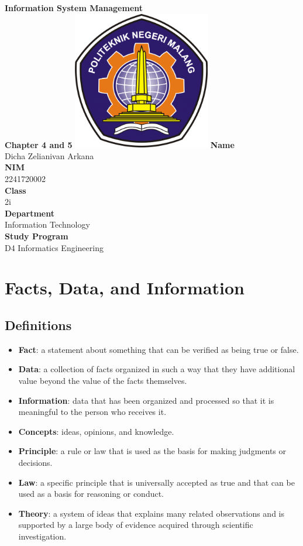 \documentclass[12pt,titlepage]{article}
\newcommand{\vSubject}{Information System Management}
\newcommand{\vSubtitle}{Chapter 4 and 5}
\newcommand{\vName}{Dicha Zelianivan Arkana}
\newcommand{\vNIM}{2241720002}
\newcommand{\vClass}{2i}
\newcommand{\vDepartment}{Information Technology}
\newcommand{\vStudyProgram}{D4 Informatics Engineering}
\begin{document}
\begin{titlepage}
    \centering
    \vfill
    {\bfseries\LARGE
        \vSubject\\
        \vskip0.25cm
        \vSubtitle
    }
    \vfill
    \includegraphics[width=6cm]{images/polinema-logo.png}
    \vfill
    {
        \textbf{Name}\\
        \vName\\
        \vskip0.5cm
        \textbf{NIM}\\
        \vNIM\\
        \vskip0.5cm
        \textbf{Class}\\
        \vClass\\
        \vskip0.5cm
        \textbf{Department}\\
        \vDepartment\\
        \vskip0.5cm
        \textbf{Study Program}\\
        \vStudyProgram
    }
\end{titlepage}

\section{Facts, Data, and Information}
\subsection{Definitions}
\begin{itemize}
    \item \textbf{Fact}: a statement about something that can be verified as being true or false.
    \item \textbf{Data}: a collection of facts organized in such a way that they have additional value beyond the value of the facts themselves.
    \item \textbf{Information}: data that has been organized and processed so that it is meaningful to the person who receives it.
    \item \textbf{Concepts}: ideas, opinions, and knowledge.
    \item \textbf{Principle}: a rule or law that is used as the basis for making judgments or decisions.
    \item \textbf{Law}: a specific principle that is universally accepted as true and that can be used as a basis for reasoning or conduct.
    \item \textbf{Theory}: a system of ideas that explains many related observations and is supported by a large body of evidence acquired through scientific investigation.
\end{itemize}
\end{document}

